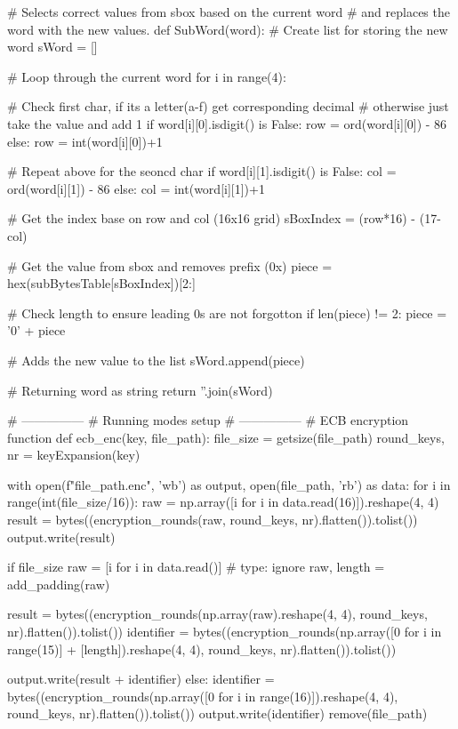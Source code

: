 \begin{python}
# Selects correct values from sbox based on the current word
# and replaces the word with the new values.
def SubWord(word):
    # Create list for storing the new word
    sWord = []

    # Loop through the current word
    for i in range(4):

        # Check first char, if its a letter(a-f) get corresponding decimal
        # otherwise just take the value and add 1
        if word[i][0].isdigit() is False:
            row = ord(word[i][0]) - 86
        else:
            row = int(word[i][0])+1

        # Repeat above for the seoncd char
        if word[i][1].isdigit() is False:
            col = ord(word[i][1]) - 86
        else:
            col = int(word[i][1])+1

        # Get the index base on row and col (16x16 grid)
        sBoxIndex = (row*16) - (17-col)

        # Get the value from sbox and removes prefix (0x)
        piece = hex(subBytesTable[sBoxIndex])[2:]

        # Check length to ensure leading 0s are not forgotton
        if len(piece) != 2:
            piece = '0' + piece

        # Adds the new value to the list
        sWord.append(piece)

    # Returning word as string
    return ''.join(sWord)


# ---------------
# Running modes setup
# ---------------
# ECB encryption function
def ecb_enc(key, file_path):
    file_size = getsize(file_path)
    round_keys, nr = keyExpansion(key)

    with open(f"{file_path}.enc", 'wb') as output, open(file_path, 'rb') as data:
        for i in range(int(file_size/16)):
            raw = np.array([i for i in data.read(16)]).reshape(4, 4)
            result = bytes((encryption_rounds(raw, round_keys, nr).flatten()).tolist())
            output.write(result)

        if file_size %
            raw = [i for i in data.read()]  # type: ignore
            raw, length = add_padding(raw)

            result = bytes((encryption_rounds(np.array(raw).reshape(4, 4), round_keys, nr).flatten()).tolist())
            identifier = bytes((encryption_rounds(np.array([0 for i in range(15)] + [length]).reshape(4, 4), round_keys, nr).flatten()).tolist())

            output.write(result + identifier)
        else:
            identifier = bytes((encryption_rounds(np.array([0 for i in range(16)]).reshape(4, 4), round_keys, nr).flatten()).tolist())
            output.write(identifier)
    remove(file_path)



\end{python}
